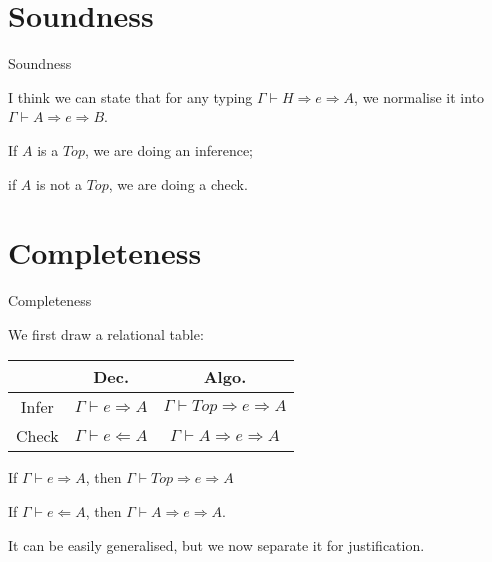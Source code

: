 \section{Soundness}

\begin{frame}{Soundness}

I think we can state that for any typing $\Gamma \vdash H \Rightarrow e \Rightarrow A$, we normalise it into $\Gamma \vdash A \Rightarrow e \Rightarrow B$. 

If $A$ is a $Top$, we are doing an inference; 

if $A$ is not a $Top$, we are doing a check.
	
\end{frame}

\section{Completeness}

\begin{frame}{Completeness}

We first draw a relational table:

\begin{tabular}{|c|c|c|}
\hline
    & Dec. & Algo. \\ 
\hline
    Infer & $\Gamma \vdash e \Rightarrow A$ &  $\Gamma \vdash Top \Rightarrow e \Rightarrow A$\\ 
\hline
   Check & $\Gamma \vdash e \Leftarrow A$ & $\Gamma \vdash A \Rightarrow e \Rightarrow A$\\
\hline
\end{tabular}

\begin{lemma}
If $\Gamma \vdash e \Rightarrow A$, then $\Gamma \vdash Top \Rightarrow e \Rightarrow A$
\end{lemma}

\begin{lemma}
If $\Gamma \vdash e \Leftarrow A$, then $\Gamma \vdash A \Rightarrow e \Rightarrow A$.
\end{lemma}

It can be easily generalised, but we now separate it for justification.

\end{frame}

